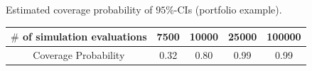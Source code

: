 
\begin{table}[]
\centering
\TABLE
{Estimated coverage probability of $95\%$-CIs (portfolio example).\label{tab.coverage_portfolio}}
{\hspace{5mm}
\begin{tabular*}{0.9\textwidth}{@{\extracolsep{\fill}}ccccc} \toprule
$\#$ of simulation evaluations & 7500 & 10000 & 25000 & 100000 \\\hline
Coverage Probability & 0.32 & 0.80 & 0.99 & 0.99 \\\bottomrule
\end{tabular*}
}{}
\end{table}
